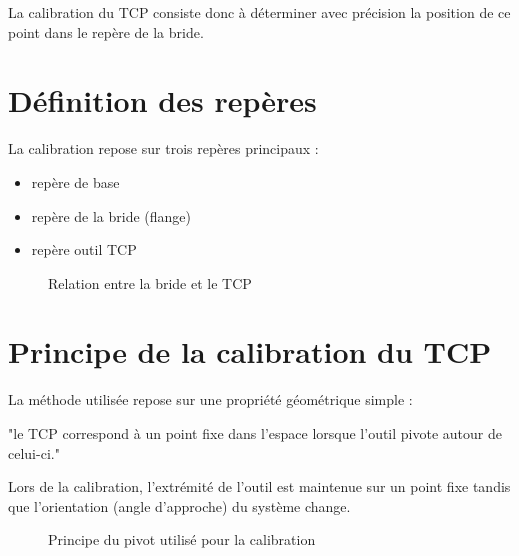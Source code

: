 \documentclass[a4paper,11pt]{article}
\begin{document}
La calibration du TCP consiste donc à déterminer avec précision la position de ce point dans le repère de la bride.

\section{Définition des repères}

La calibration repose sur trois repères principaux :

\begin{itemize}
\item repère de base
\item repère de la bride (flange)
\item repère outil TCP
\end{itemize}

\begin{figure}[h]
\centering
{}

\caption{Relation entre la bride et le TCP}
\end{figure}

\section{Principe de la calibration du TCP}

La méthode utilisée repose sur une propriété géométrique simple :

\begin{center}
"le TCP correspond à un point fixe dans l’espace lorsque l’outil pivote autour de celui-ci."
\end{center}

Lors de la calibration, l’extrémité de l’outil est maintenue sur un point fixe tandis que l’orientation (angle d'approche) du système change.

\begin{figure}[h]
\centering
{}

\caption{Principe du pivot utilisé pour la calibration}
\end{figure}
\end{document}
